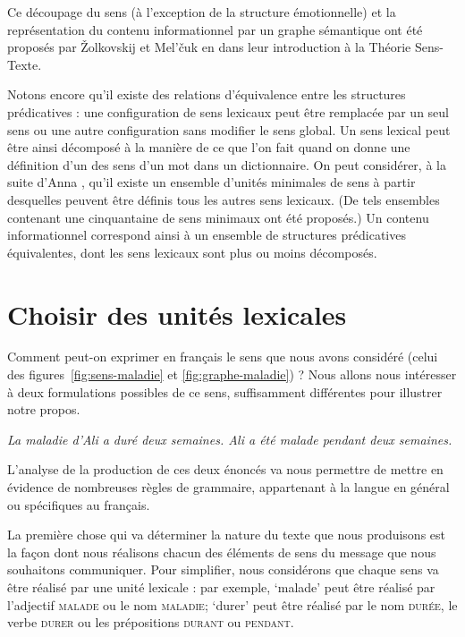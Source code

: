 {    Ce découpage du sens (à l’exception de la structure émotionnelle) et la représentation du contenu informationnel par un graphe sémantique ont été proposés par Žolkovskij et Mel’čuk en \citeyear{zolkovski1967semanticeskom} dans leur introduction à la Théorie Sens-Texte.

    Notons encore qu’il existe des relations d’équivalence entre les structures prédicatives : une configuration de sens lexicaux peut être remplacée par un seul sens ou une autre configuration sans modifier le sens global. Un sens lexical peut être ainsi décomposé à la manière de ce que l’on fait quand on donne une définition d’un des sens d’un mot dans un dictionnaire. On peut considérer, à la suite d’Anna \citet{wierzbivcka1980lingua}, qu’il existe un ensemble d’unités minimales de sens à partir desquelles peuvent être définis tous les autres sens lexicaux. (De tels ensembles contenant une cinquantaine de sens minimaux ont été proposés.) Un contenu informationnel correspond ainsi à un ensemble de structures prédicatives équivalentes, dont les sens lexicaux sont plus ou moins décomposés.
}
\section{Choisir des unités lexicales}\label{sec:1.2.5}

Comment peut-on exprimer en français le sens que nous avons considéré (celui des figures~\ref{fig:sens-maladie} et \ref{fig:graphe-maladie}) ?  Nous allons nous intéresser à deux formulations possibles de ce sens, suffisamment différentes pour illustrer notre propos.

\ea\label{ex:maladie}
\ea
          \itshape La maladie d’Ali a duré deux semaines.
\ex
           \itshape Ali a été malade pendant deux semaines.
\z\z

L’analyse de la production de ces deux énoncés va nous permettre de mettre en évidence de nombreuses règles de grammaire, appartenant à la langue en général ou spécifiques au français.

La première chose qui va déterminer la nature du texte que nous produisons est la façon dont nous réalisons chacun des éléments de sens du message que nous souhaitons communiquer. Pour simplifier, nous considérons que chaque sens va être réalisé par une unité lexicale : par exemple, ‘malade’ peut être réalisé par l’adjectif \textsc{malade} ou le nom \textsc{maladie}; ‘durer’ peut être réalisé par le nom \textsc{durée}, le verbe \textsc{durer} ou les prépositions \textsc{durant} ou \textsc{pendant}.

